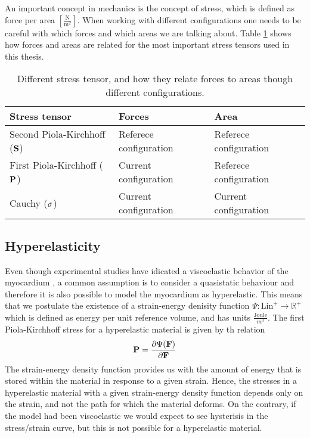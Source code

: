 An important concept in mechanics is the concept of stress, which is
defined as force per area
$\left[\frac{\mathrm{N}}{\mathrm{m}^2}\right]$. When working with
different configurations one needs to be careful with which forces and
which areas we are talking about. Table \ref{tab:stress_tensor}
shows how forces and areas are related for the most important stress
tensors used in this thesis.  

\begin{table}[h]
  \centering
  \begin{tabular}{lll}
    \toprule
    Stress tensor & Forces & Area \\
    \midrule
    Second Piola-Kirchhoff ($\mathbf{S}$) & Referece configuration & Referece configuration \\
    First Piola-Kirchhoff ($\mathbf{P}$) & Current configuration  &  Referece configuration \\
    Cauchy ($\mathbf{\sigma}$) &  Current configuration & Current configuration  \\
    \bottomrule
  \end{tabular}
  \caption{\label{tab:stress_tensor}Different stress tensor, and how
    they relate forces to areas though different configurations.}
\end{table}



\subsection{Hyperelasticity}

Even though experimental studies have idicated a viscoelastic behavior
of the myocardium \cite{dokos2002shear, gultekin2016orthotropic}, a
common assumption is to consider a quasistatic behaviour and therefore
it is also possible to model the myocardium as hyperelastic.
This means that we postulate the existence of
a strain-energy denisity function $\Psi:\mathrm{Lin}^+ \rightarrow
\mathbb{R}^+$ which is defined as energy per unit reference volume,
and has units $\frac{\text{Joule}}{m^3}$. The first Piola-Kirchhoff
stress for a hyperelastic material is given by th relation
\begin{align}
\mathbf{P} = \frac{\partial \Psi(\mathbf{F})}{\partial \mathbf{F}}
\end{align}
The strain-energy density function provides us with the amount of
energy that is stored within the material in response to a given
strain. Hence, the stresses in a hyperelastic material with a given
strain-energy density function depends only on the strain, and not the
path for which the material deforms. On the contrary, if the model had
been viscoelastic we would expect to see hysterisis in the
stress/strain curve, but this is not possible for a hyperelastic
material. 

